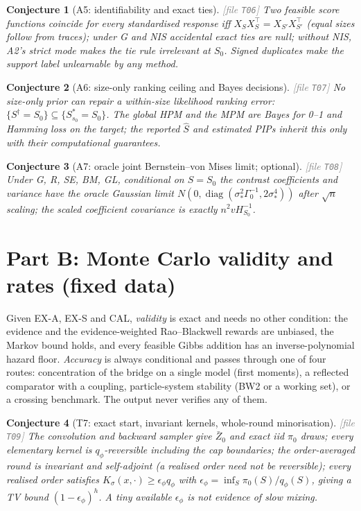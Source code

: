 \documentclass[11pt,a4paper]{article}
\theoremstyle{plain}
\newtheorem{conjecture}{Conjecture}[section]
\theoremstyle{definition}
\theoremstyle{remark}
\newcommand{\Sz}{S_0}
\newcommand{\Sdag}{S^{\dagger}}
\newcommand{\Shat}{\widehat S}
\newcommand{\sz}{s_0}
\newcommand{\Zbar}{\bar Z}
\newcommand{\pizero}{\pi_0}
\newcommand{\thfile}[1]{\textcolor{gray}{\footnotesize[file \texttt{#1}]}}
\begin{document}
\begin{conjecture}[A5: identifiability and exact ties]\thfile{T06}
Two feasible score functions coincide for every standardised response iff $X_SX_S^\top=X_{S'}X_{S'}^\top$ (equal sizes follow from traces); under G and NIS accidental exact ties are null; without NIS, A2's strict mode makes the tie rule irrelevant at $\Sz$. Signed duplicates make the support label unlearnable by any method.
\end{conjecture}

\begin{conjecture}[A6: size-only ranking ceiling and Bayes decisions]\thfile{T07}
No size-only prior can repair a within-size likelihood ranking error: $\{\Sdag=\Sz\}\subseteq\{S^*_{\sz}=\Sz\}$. The global HPM and the MPM are Bayes for 0--1 and Hamming loss on the target; the reported $\Shat$ and estimated PIPs inherit this only with their computational guarantees.
\end{conjecture}

\begin{conjecture}[A7: oracle joint Bernstein--von Mises limit; optional]\thfile{T08}
Under G, R, SE, BM, GL, conditional on $S=\Sz$ the contrast coefficients and variance have the oracle Gaussian limit $N(0,\operatorname{diag}(\sigma_*^2\Gamma_0^{-1},2\sigma_*^4))$ after $\sqrt n$ scaling; the scaled coefficient covariance is exactly $n^2vH_{\Sz}^{-1}$.
\end{conjecture}

\section{Part B: Monte Carlo validity and rates (fixed data)}

Given EX-A, EX-S and CAL, \emph{validity} is exact and needs no other condition: the evidence and the evidence-weighted Rao--Blackwell rewards are unbiased, the Markov bound holds, and every feasible Gibbs addition has an inverse-polynomial hazard floor. \emph{Accuracy} is always conditional and passes through one of four routes: concentration of the bridge on a single model (first moments), a reflected comparator with a coupling, particle-system stability (BW2 or a working set), or a crossing benchmark. The output never verifies any of them.

\begin{conjecture}[T7: exact start, invariant kernels, whole-round minorisation]\thfile{T09}
The convolution and backward sampler give $\Zbar_0$ and exact iid $\pizero$ draws; every elementary kernel is $q_\phi$-reversible including the cap boundaries; the order-averaged round is invariant and self-adjoint (a realised order need not be reversible); every realised order satisfies $K_\sigma(x,\cdot)\ge\epsilon_\phi q_\phi$ with $\epsilon_\phi=\inf_S\pizero(S)/q_\phi(S)$, giving a TV bound $(1-\epsilon_\phi)^h$. A tiny available $\epsilon_\phi$ is not evidence of slow mixing.
\end{conjecture}
\end{document}
